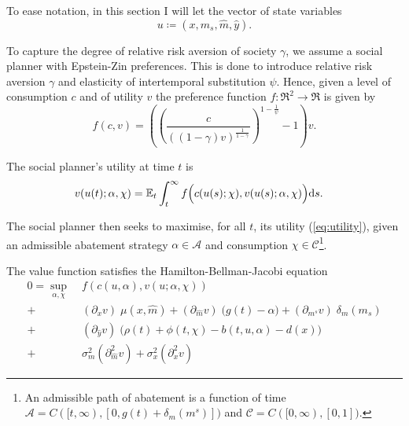 \documentclass[../../main.tex]{subfiles}
\begin{document}
To ease notation, in this section I will let the vector of state variables \begin{equation}
    u \coloneqq (x, m_s, \hat m, \hat y).
\end{equation}

To capture the degree of relative risk aversion of society $\gamma$, we assume a social planner with Epstein-Zin preferences. This is done to introduce relative risk aversion $\gamma$ and elasticity of intertemporal substitution $\psi$. Hence, given a level of consumption $c$ and of utility $v$ the preference function $f: \Re^2 \to \Re$ is given by \begin{equation}
    f(c, v) = \left( \left( \frac{c}{((1 - \gamma) v)^{\frac{1}{1 - \gamma}}} \right)^{1 - \frac{1}{\psi}} - 1 \right) v.
\end{equation}

The social planner's utility at time $t$ is \begin{equation} \label{eq:utility}
    \begin{split}
        v(u(t); \alpha, \chi) &= \operatorname{\mathbb{E}}_t \int^{\infty}_t f\Big(c(u(s); \chi), v(u(s); \alpha, \chi) \Big) \mathrm{d}s.
    \end{split}
\end{equation} 

The social planner then seeks to maximise, for all $t$, its utility (\ref{eq:utility}), given an admissible abatement strategy $\alpha \in \mathcal{A}$ and consumption $\chi \in \mathcal{C}$\footnote{
    An admissible path of abatement is a function of time $\mathcal{A} = C([t, \infty), [0, g(t) + \delta_m(m^s)])$ and $\mathcal{C} = C([0, \infty), [0, 1])$.
}.

\begin{proposition}
    The value function satisfies the Hamilton-Bellman-Jacobi equation \begin{equation}
        \begin{split}
            0 = \sup_{\alpha, \chi} \; &f(c(u, \alpha), v(u; \alpha, \chi)) \\
            + \; &(\partial_x v) \; \mu(x, \hat m) + (\partial_{\hat m} v) \; \big(g(t) - \alpha \big) + (\partial_{m^s} v) \; \delta_m(m_s) \\
            + \; &(\partial_{\hat y} v) \; \big(\rho(t) + \phi(t, \chi) - b(t, u, \alpha) - d(x) \big) \\
            + \; &\sigma^2_m (\partial^2_{\hat m} v) + \sigma^2_x (\partial^2_x v)
        \end{split}
    \end{equation}
\end{proposition}
\end{document}
